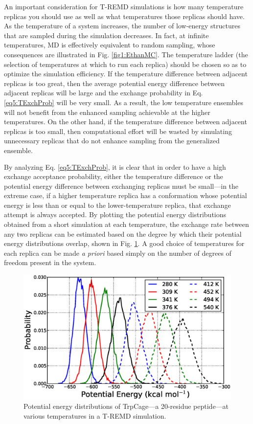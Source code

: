 An important consideration for T-REMD simulations is how many temperature
replicas you should use as well as what temperatures those replicas should have.
As the temperature of a system increases, the number of low-energy structures
that are sampled during the simulation decreases. In fact, at infinite
temperatures, MD is effectively equivalent to random sampling, whose
consequences are illustrated in Fig. \ref{fig1:EthanMC}. The temperature ladder
(\ie the selection of temperatures at which to run each replica) should be
chosen so as to optimize the simulation efficiency. If the temperature
difference between adjacent replicas is too great, then the average potential
energy difference between adjacent replicas will be large and the exchange
probability in Eq. \ref{eq5:TExchProb} will be very small. As a result, the low
temperature ensembles will not benefit from the enhanced sampling achievable at
the higher temperatures. On the other hand, if the temperature difference
between adjacent replicas is too small, then computational effort will be wasted
by simulating unnecessary replicas that do not enhance sampling from the
generalized ensemble.

By analyzing Eq. \ref{eq5:TExchProb}, it is clear that in order to have a high
exchange acceptance probability, either the temperature difference or the
potential energy difference between exchanging replicas must be small---in the
extreme case, if a higher temperature replica has a conformation whose potential
energy is less than or equal to the lower-temperature replica, that exchange
attempt is always accepted. By plotting the potential energy distributions
obtained from a short simulation at each temperature, the exchange rate between
any two replicas can be estimated based on the degree by which their potential
energy distributions overlap, shown in Fig. \ref{fig5:TempOverlap}. A good
choice of temperatures for each replica can be made \emph{a priori} based simply
on the number of degrees of freedom present in the system.
\cite{TREMD_Predictor} 

\begin{figure}
   \includegraphics[width=6.5in]{TempOverlap.ps}
   \caption{Potential energy distributions of TrpCage---a 20-residue
            peptide---at various temperatures in a T-REMD simulation.}
   \label{fig5:TempOverlap}
\end{figure}

